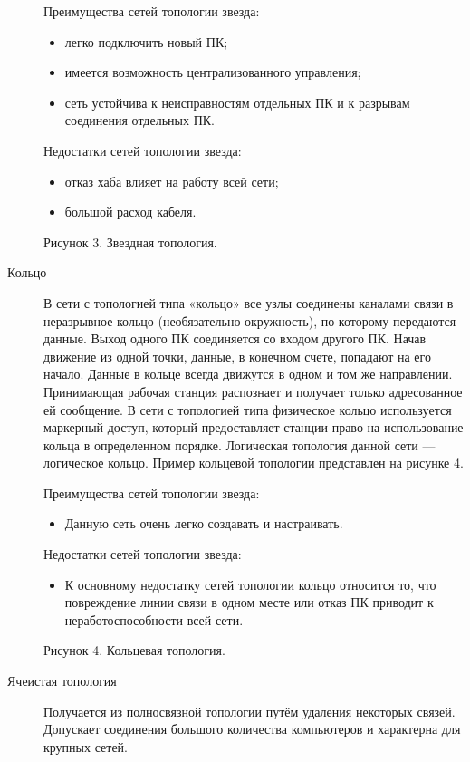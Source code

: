 \begin{description}
Преимущества сетей топологии звезда:
\begin{itemize}
\item легко подключить новый ПК;
\item имеется возможность централизованного управления;
\item сеть устойчива к неисправностям отдельных ПК и к разрывам соединения отдельных ПК.
\end{itemize}

Недостатки сетей топологии звезда:
\begin{itemize}
\item отказ хаба влияет на работу всей сети;
\item большой расход кабеля.
\end{itemize}
	 
Рисунок 3. Звездная топология.

\item[Кольцо]
    В сети с топологией типа «кольцо» все узлы соединены каналами связи в неразрывное кольцо (необязательно окружность), по которому передаются данные. Выход одного ПК соединяется со входом другого ПК. Начав движение из одной точки, данные, в конечном счете, попадают на его начало. Данные в кольце всегда движутся в одном и том же направлении.
Принимающая рабочая станция распознает и получает только адресованное ей сообщение. В сети с топологией типа физическое кольцо используется маркерный доступ, который предоставляет станции право на использование кольца в определенном порядке. Логическая топология данной сети — логическое кольцо. Пример кольцевой топологии представлен на рисунке 4.

Преимущества сетей топологии звезда:
\begin{itemize}
\item Данную сеть очень легко создавать и настраивать.
\end{itemize}

Недостатки сетей топологии звезда:
\begin{itemize}
\item К основному недостатку сетей топологии кольцо относится то, что повреждение линии связи в одном месте или отказ ПК приводит к неработоспособности всей сети.
\end{itemize}

Рисунок 4. Кольцевая топология.

\item[Ячеистая топология]
  Получается из полносвязной топологии путём удаления некоторых связей. Допускает соединения большого количества компьютеров и характерна для крупных сетей.


\end{description}
